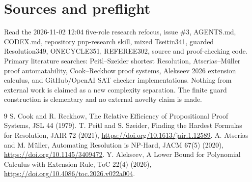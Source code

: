\documentclass[11pt]{article}
\begin{document}
\section*{Sources and preflight}
Read the 2026-11-02 12:04 five-role research refocus, issue \#3, AGENTS.md, CODEX.md, repository pnp-research skill, mixed Tseitin341, guarded Resolution349, ONECYCLE351, REFEREE302, source and proof-checking code. Primary literature searches: Peitl--Szeider shortest Resolution, Atserias--M\"uller proof automatability, Cook--Reckhow proof systems, Alekseev 2026 extension calculus, and GitHub/OpenAI SAT checker implementations. Nothing from external work is claimed as a new complexity separation. The finite guard construction is elementary and no external novelty claim is made.
\begin{thebibliography}{9}
 S. Cook and R. Reckhow, The Relative Efficiency of Propositional Proof Systems, JSL 44 (1979).
 T. Peitl and S. Szeider, Finding the Hardest Formulas for Resolution, JAIR 72 (2021), \url{https://doi.org/10.1613/jair.1.12589}.
 A. Atserias and M. M\"uller, Automating Resolution is NP-Hard, JACM 67(5) (2020), \url{https://doi.org/10.1145/3409472}.
 Y. Alekseev, A Lower Bound for Polynomial Calculus with Extension Rule, ToC 22(4) (2026), \url{https://doi.org/10.4086/toc.2026.v022a004}.
\end{thebibliography}
\end{document}
